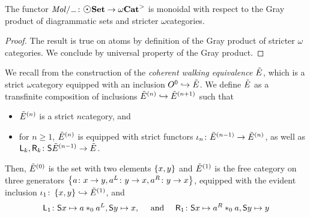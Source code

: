 \begin{lem} \label{lem:molecin_monoidal}
    The functor \( \molecin{-} \colon \dgmSet \to \somegaCat \) is monoidal with respect to the Gray product of diagrammatic sets and stricter \( \omega \)\nbd categories.
\end{lem}
\begin{proof}
    The result is true on atoms by definition of the Gray product of stricter \( \omega \)\nbd categories.
    We conclude by universal property of the Gray product.
\end{proof}

\begin{dfn} 
    We recall from \cite{hadzihasanovic2024model} the construction of the \emph{coherent walking equivalence \( \tilde E \)}, which is a strict \( \omega \)\nbd category equipped with an inclusion \( O^{0} \hookrightarrow \tilde E \).
    We define \( \tilde E \) as a transfinite composition of inclusions \( \tilde E^{(n)} \hookrightarrow \tilde E^{(n + 1)} \) such that
    \begin{itemize}
        \item \( \tilde E^{(n)} \) is a strict \( n \)\nbd category, and
        \item for \( n \geq 1 \), \( \tilde E^{(n)} \) is equipped with strict functors \( \iota_n \colon \tilde E^{(n - 1)} \to \tilde E^{(n)} \),
    as well as \( \mathsf{L}_k, \mathsf{R}_k \colon \mathsf{S}{\tilde E^{(n - 1)}} \to \tilde E \).
    \end{itemize}
    Then, \( \tilde E^{(0)} \) is the set with two elements \( \left\{ {x, y} \right\} \) and \( \tilde E^{(1)} \) is the free category on three generators \( \left\{ {a \colon x \to y, a^L \colon y \to x, a^R \colon y \to x} \right\} \), equipped with the evident inclusion \( \iota_1 \colon \left\{ {x, y} \right\} \hookrightarrow \tilde E^{(1)} \), and
    \begin{equation*}
        \mathsf{L}_1 \colon \mathsf{S}{x} \mapsto a *_{0} a^L, \mathsf{S}{y} \mapsto x, \quad\text{ and }\quad \mathsf{R}_1 \colon \mathsf{S}{x} \mapsto a^R *_{0} a, \mathsf{S}{y} \mapsto y
    \end{equation*}


\end{dfn}
